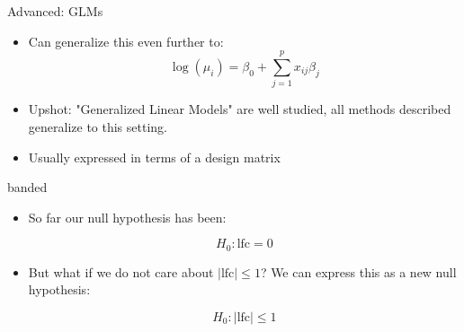 \documentclass[red,xcolor={table,usenames,dvipsnames}]{beamer}
\begin{document}
\begin{frame}{Advanced: GLMs}
  \begin{itemize}
    \item Can generalize this even further to:
      $$\log(\mu_i) = \beta_0 + \sum_{j=1}^p x_{ij} \beta_j$$
    \item Upshot: "Generalized Linear Models" are well studied, all methods described generalize to this setting.
    \item Usually expressed in terms of a design matrix
  \end{itemize}
\end{frame}

\begin{frame}{banded}
\begin{itemize}
  \item So far our null hypothesis has been:

  $$H_0: \text{lfc} = 0 $$

  \item But what if we do not care about $|\text{lfc}|\leq 1$? We can express this as a new null hypothesis:

  $$H_0: |\text{lfc}| \leq 1$$
\end{itemize}
\end{frame}
\end{document}
